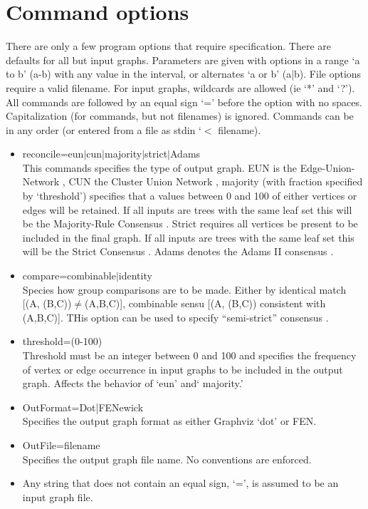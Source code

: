 \documentclass[11pt]{memoir}
\begin{document}
	\section{Command options}
	There are only a few program options that require specification.  There are defaults for all but input graphs.  
	Parameters are given with options in a range `a to b' (a-b) with any value in the interval, or alternates `a or b' (a|b). File options require a valid filename.
	For input graphs, wildcards are allowed (ie `*' and `?').  All commands are followed by an equal sign `=' before the option with no spaces.  Capitalization (for commands, but not filenames) is ignored.  Commands can be in any order (or entered from a file as stdin `$<$ filename).
	
	
	\begin{itemize}
		\item {reconcile=eun$\mid$cun$\mid$majority$\mid$strict$\mid$Adams\\This commands specifies the type of output graph.
		EUN is the Edge-Union-Network \cite{MiyagiandWheeler2019}, CUN the Cluster Union Network \citep{Baroni2005},
		majority (with fraction specified by `threshold') specifies that a values between 0 and 100 of either vertices or edges will be retained.  If all inputs are trees with the same leaf set this will be the Majority-Rule Consensus \citep{MargushandMcMorris1981}.
		Strict requires all vertices be present to be included in the final graph.  If all inputs are trees with the same leaf set this will be the Strict Consensus \citep{Schuhandpolhemus1980}. Adams denotes the Adams II consensus \citep{Adams1972}.}
		\item{compare=combinable$\mid$identity\\Species how group comparisons are to be made.  Either by identical match [(A, (B,C))$\neq$(A,B,C)],
			combinable sensu \cite{Nelson1979} [(A, (B,C)) consistent with (A,B,C)].  THis option can be used to specify ``semi-strict'' consensus
			\citep{Bremer1990}.
		}
		\item{threshold=(0-100)\\Threshold must be an integer between 0 and 100 and specifies the frequency of vertex or edge occurrence in input graphs to be included in the output graph.  Affects the behavior of `eun' and` majority.'
		}
		\item{OutFormat=Dot|FENewick\\Specifies the output graph format as either Graphviz `dot' or FEN.
		}
		\item{OutFile=filename\\Specifies the output graph file name. No conventions are enforced.
		}
		\item{Any string that does not contain an equal sign, `=', is assumed to be an input graph file. 
		}
	\end{itemize}
	
\end{document}
